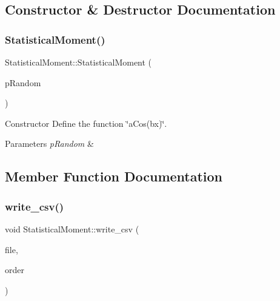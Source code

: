 \subsection{Constructor \& Destructor Documentation}
\mbox{\label{classStatisticalMoment_a31fd5717c856681fc9535837e82fcfbe}} 
\subsubsection{\texorpdfstring{Statistical\+Moment()}{StatisticalMoment()}}
{\footnotesize\ttfamily Statistical\+Moment\+::\+Statistical\+Moment (\begin{DoxyParamCaption}\item[{\hyperlink{classAbstractVariable}{Abstract\+Variable} $\ast$}]{p\+Random }\end{DoxyParamCaption})}



Constructor Define the function \char`\"{}a\+Cos(bx)\char`\"{}. 


\begin{DoxyParams}{Parameters}
{\em p\+Random} & \\
\hline
\end{DoxyParams}


\subsection{Member Function Documentation}
\mbox{\label{classStatisticalMoment_a7e0fb1cf645bfd8cda912d78c1aa20ed}} 
\subsubsection{\texorpdfstring{write\+\_\+csv()}{write\_csv()}}
{\footnotesize\ttfamily void Statistical\+Moment\+::write\+\_\+csv (\begin{DoxyParamCaption}\item[{const char $\ast$}]{file,  }\item[{int}]{order }\end{DoxyParamCaption})}



